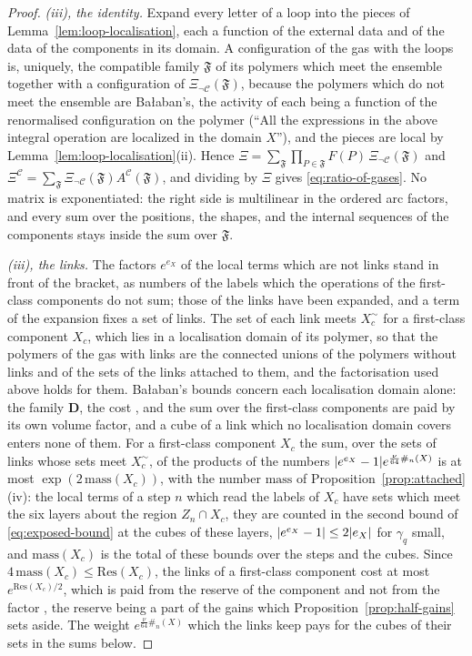 \documentclass[11pt]{preprint}
\DeclarePairedDelimiter{\abs}{\lvert}{\rvert}
\numberwithin{equation}{section}
\theoremstyle{definition}
\theoremstyle{remark}
\theoremstyle{plain}
\begin{document}
\begin{proof}
\emph{(iii), the identity.} Expand every letter of a loop into the pieces of Lemma~\ref{lem:loop-localisation}, each a function of the external data and of the data of the components in its domain. A configuration of the gas with the loops is, uniquely, the compatible family $\mathfrak F$ of its polymers which meet the ensemble together with a configuration of $\Xi_{\neg\mathcal C}(\mathfrak F)$, because the polymers which do not meet the ensemble are Ba{\l}aban's, the activity of each being a function of the renormalised configuration on the polymer \cite[p.~379]{BalabanLFR2} (``All the expressions in the above integral operation are localized in the domain $X$''), and the pieces are local by Lemma~\ref{lem:loop-localisation}(ii). Hence $\Xi = \sum_{\mathfrak F}\prod_{P \in \mathfrak F}F(P)\,\Xi_{\neg\mathcal C}(\mathfrak F)$ and $\Xi^{\mathcal C} = \sum_{\mathfrak F}\Xi_{\neg\mathcal C}(\mathfrak F)A^{\mathcal C}(\mathfrak F)$, and dividing by $\Xi$ gives \eqref{eq:ratio-of-gases}. No matrix is exponentiated: the right side is multilinear in the ordered arc factors, and every sum over the positions, the shapes, and the internal sequences of the components stays inside the sum over $\mathfrak F$.

\emph{(iii), the links.} The factors $e^{e_X}$ of the local terms which are not links stand in front of the bracket, as numbers of the labels which the operations of the first-class components do not sum; those of the links have been expanded, and a term of the expansion fixes a set of links. The set of each link meets $X_c^\sim$ for a first-class component $X_c$, which lies in a localisation domain of its polymer, so that the polymers of the gas with links are the connected unions of the polymers without links and of the sets of the links attached to them, and the factorisation used above holds for them. Ba{\l}aban's bounds \cite[(1.91)--(1.97)]{BalabanLFR2} concern each localisation domain alone: the family $\mathbf D$, the cost \cite[(1.94)]{BalabanLFR2}, and the sum \cite[(1.96)]{BalabanLFR2} over the first-class components are paid by its own volume factor, and a cube of a link which no localisation domain covers enters none of them. For a first-class component $X_c$ the sum, over the sets of links whose sets meet $X_c^\sim$, of the products of the numbers $\abs{e^{e_X} - 1}e^{\frac{\nu}{64}\#_n(X)}$ is at most $\exp(2\,\mathrm{mass}(X_c))$, with the number $\mathrm{mass}$ of Proposition~\ref{prop:attached}(iv): the local terms of a step $n$ which read the labels of $X_c$ have sets which meet the six layers about the region $Z_n \cap X_c$, they are counted in the second bound of \eqref{eq:exposed-bound} at the cubes of these layers, $\abs{e^{e_X} - 1} \leq 2\abs{e_X}$ for $\gamma_q$ small, and $\mathrm{mass}(X_c)$ is the total of these bounds over the steps and the cubes. Since $4\,\mathrm{mass}(X_c) \leq \mathrm{Res}(X_c)$, the links of a first-class component cost at most $e^{\mathrm{Res}(X_c)/2}$, which is paid from the reserve of the component and not from the factor \cite[(1.89)]{BalabanLFR2}, the reserve being a part of the gains which Proposition~\ref{prop:half-gains} sets aside. The weight $e^{\frac{\nu}{64}\#_n(X)}$ which the links keep pays for the cubes of their sets in the sums below.


\end{proof}
\end{document}
